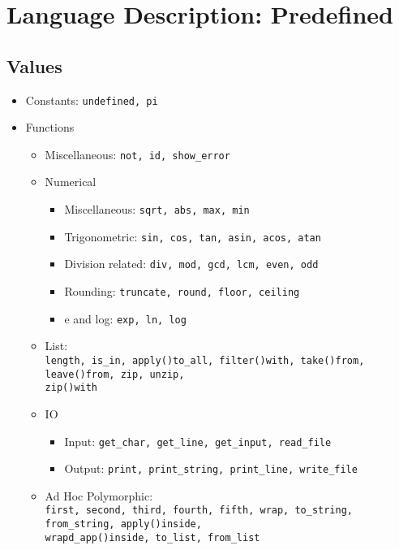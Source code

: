 \documentclass{article}
\begin{document}
\newpage

\section{Language Description: Predefined}

\subsection{Values}

\begin{itemize}

\item Constants: \texttt{undefined, pi}

\item Functions
  \begin{itemize}

  \item Miscellaneous: \texttt{not, id, show_error}

  \item Numerical
    \begin{itemize}
    \item Miscellaneous: \texttt{sqrt, abs, max, min}
    \item Trigonometric: \texttt{sin, cos, tan, asin, acos, atan}
    \item Division related: \texttt{div, mod, gcd, lcm, even, odd}
    \item Rounding: \texttt{truncate, round, floor, ceiling}
    \item e and log: \texttt{exp, ln, log}
    \end{itemize}

  \item List:\\
    \texttt{length, is_in, apply()to_all, filter()with, take()from,
    leave()from, zip, unzip,\\ zip()with}

  \item IO
    \begin{itemize}
    \item Input: \texttt{get_char, get_line, get_input, read_file}
    \item Output: \texttt{print, print_string, print_line, write_file}
    \end{itemize}

  \item Ad Hoc Polymorphic:\\
  \texttt{first, second, third, fourth, fifth, wrap, to_string, from_string,
  apply()inside, \\wrapd_app()inside, to_list, from_list}

  \end{itemize}
\end{itemize}
\end{document}
